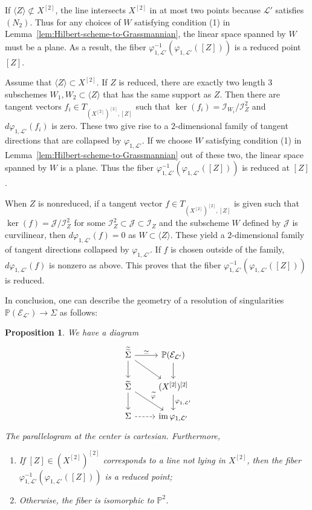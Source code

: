 \documentclass[a4paper]{amsart}
\numberwithin{equation}{section}
\theoremstyle{plain}
\newtheorem{prop}[thm]{Proposition}
\theoremstyle{definition}
\theoremstyle{remark}
\numberwithin{figure}{section}
\numberwithin{table}{section}
\numberwithin{equation}{section}
\def \PP {\mathbb{P}}
\def \Ecal {\mathcal{E}}
\def \Ical {\mathcal{I}}
\def \Jcal {\mathcal{J}}
\def \Lcal {\mathcal{L}}
\DeclareMathOperator{\im}{im}
\begin{document}
If $\langle Z \rangle \not\subset X^{[2]}$, the line intersects $X^{[2]}$ in at most two points because $\Lcal'$ satisfies $(N_2)$.
Thus for any choices of $W$ satisfying condition (1) in Lemma~\ref{lem:Hilbert-scheme-to-Grassmannian}, the linear space spanned by $W$ must be a plane.
As a result, the fiber $\varphi_{1, \Lcal'}^{-1}(\varphi_{1, \Lcal'}([Z]))$ is a reduced point $[Z]$.

Assume that $\langle Z \rangle \subset X^{[2]}$.
If $Z$ is reduced, there are exactly two length 3 subschemes $W_1, W_2 \subset \langle Z \rangle$ that has the same support as $Z$.
Then there are tangent vectors $f_i \in T_{(X^{[2]})^{[2]}, [Z]}$ such that $\ker(f_i) = \Ical_{W_i}/\Ical_Z^2$ and $d\varphi_{1, \Lcal'}(f_i)$ is zero.
These two give rise to a $2$-dimensional family of tangent directions that are collapsed by $\varphi_{1, \Lcal'}$.
If we choose $W$ satisfying condition (1) in Lemma~\ref{lem:Hilbert-scheme-to-Grassmannian} out of these two, the linear space spanned by $W$ is a plane.
Thus the fiber $\varphi_{1, \Lcal'}^{-1}(\varphi_{1, \Lcal'}([Z]))$ is reduced at $[Z]$.

When $Z$ is nonreduced, if a tangent vector $f \in T_{(X^{[2]})^{[2]}, [Z]}$ is given such that $\ker(f) = \Jcal/\Ical_Z^2$ for some $\Ical_Z^2 \subset \Jcal \subset \Ical_Z$ and the subscheme $W$ defined by $\Jcal$ is curvilinear, then $d\varphi_{1, \Lcal'}(f) = 0$ as $W \subset \langle Z \rangle$.
These yield a $2$-dimensional family of tangent directions collapsed by $\varphi_{1, \Lcal'}$.
If $f$ is chosen outside of the family, $d\varphi_{1, \Lcal'}(f)$ is nonzero as above.
This proves that the fiber $\varphi_{1, \Lcal'}^{-1}(\varphi_{1, \Lcal'}([Z]))$ is reduced.

In conclusion, one can describe the geometry of a resolution of singularities $\PP(\Ecal_{\Lcal'}) \rightarrow \Sigma$ as follows:

\begin{prop} \label{prop:resolution-of-singularities-of-secant}
    We have a diagram
     \[
      \begin{tikzcd}
          \widetilde{\widetilde{\Sigma}} \arrow[r, "\simeq"] \arrow[rd] \arrow[d] & \PP(\Ecal_{\Lcal'}) \arrow{d} \\
          \widetilde{\Sigma} \arrow[rd, "\widetilde{\varphi}"] \arrow{d} & (X^{[2]})^{[2]} \arrow[d, "\varphi_{1, \Lcal'}"] \\
          \Sigma \arrow[r, dashrightarrow] & \im \varphi_{1, \Lcal'}
      \end{tikzcd}
     \]
    The parallelogram at the center is cartesian.
    Furthermore,
    \begin{enumerate}
        \item If $[Z] \in (X^{[2]})^{[2]}$ corresponds to a line not lying in $X^{[2]}$, then the fiber $\varphi_{1, \Lcal'}^{-1}(\varphi_{1, \Lcal'}([Z]))$ is a reduced point;
        \item Otherwise, the fiber is isomorphic to $\PP^2$.
    \end{enumerate}
\end{prop}
\end{document}
